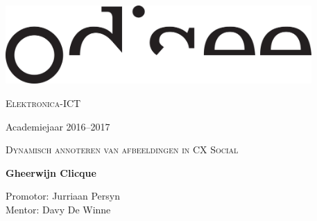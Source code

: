 
\begin{titlepage}

\fontsize{12pt}{14pt}

\begin{center}

\includegraphics[height=3cm]{Figuren/odisee_logo.jpg}

\vspace{1cm}

\fontsize{14pt}{17pt}\selectfont
\textsc{Elektronica-ICT}
\fontsize{12pt}{14pt}\selectfont
\vspace{0.3cm}

\vspace{1cm}

Academiejaar 2016--2017

\vspace{5.8cm}

\fontsize{17.28pt}{21pt}\selectfont

\textsc{Dynamisch annoteren van afbeeldingen in CX Social}

\fontsize{14pt}{16pt}\selectfont

\vspace{5.8cm}

\textbf{Gheerwijn Clicque}

\vspace{1.0cm}
\fontsize{12pt}{14pt}\selectfont

Promotor: Jurriaan Persyn\\ 
Mentor: Davy De Winne

\vspace{2cm}

\end{center}
\end{titlepage}

\thispagestyle{empty}
